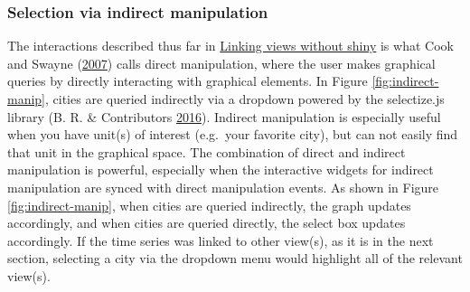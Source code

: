 \documentclass[12pt,]{isuthesis}
\newenvironment{Shaded}{\begin{snugshade}}{\end{snugshade}}
\newcommand{\KeywordTok}[1]{\textcolor[rgb]{0.13,0.29,0.53}{\textbf{{#1}}}}
\newcommand{\DataTypeTok}[1]{\textcolor[rgb]{0.13,0.29,0.53}{{#1}}}
\newcommand{\StringTok}[1]{\textcolor[rgb]{0.31,0.60,0.02}{{#1}}}
\newcommand{\CommentTok}[1]{\textcolor[rgb]{0.56,0.35,0.01}{\textit{{#1}}}}
\newcommand{\OtherTok}[1]{\textcolor[rgb]{0.56,0.35,0.01}{{#1}}}
\newcommand{\NormalTok}[1]{{#1}}
\begin{document}
\subsubsection{Selection via indirect
manipulation}\label{selection-via-indirect-manipulation}

The interactions described thus far in
\protect\hyperlink{linking-views-without-shiny}{Linking views without
shiny} is what Cook and Swayne
(\protect\hyperlink{ref-ggobi:2007}{2007}) calls direct manipulation,
where the user makes graphical queries by directly interacting with
graphical elements. In Figure \ref{fig:indirect-manip}, cities are
queried indirectly via a dropdown powered by the selectize.js library
(B. R. \& Contributors \protect\hyperlink{ref-selectizejs}{2016}).
Indirect manipulation is especially useful when you have unit(s) of
interest (e.g.~your favorite city), but can not easily find that unit in
the graphical space. The combination of direct and indirect manipulation
is powerful, especially when the interactive widgets for indirect
manipulation are synced with direct manipulation events. As shown in
Figure \ref{fig:indirect-manip}, when cities are queried indirectly, the
graph updates accordingly, and when cities are queried directly, the
select box updates accordingly. If the time series was linked to other
view(s), as it is in the next section, selecting a city via the dropdown
menu would highlight all of the relevant view(s).

\begin{Shaded}
\end{Shaded}
\end{document}
